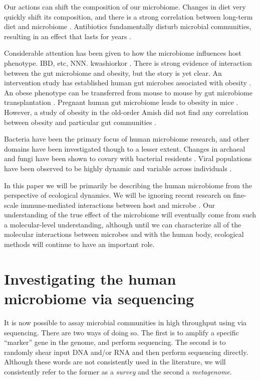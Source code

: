 \documentclass{amsart}
\begin{document}
Our actions can shift the composition of our microbiome.
Changes in diet very quickly shift its composition, and there is a strong correlation between long-term diet and microbiome \citep{li2009human,wu2011linking}.
Antibiotics fundamentally disturb microbial communities, resulting in an effect that lasts for years \citep{jernberg2007long,dethlefsen2008pervasive,jakobsson2010short,dethlefsen2011incomplete}.

Considerable attention has been given to how the microbiome influences host phenotype.
IBD, etc, NNN.
kwashiorkor \cite{smith2013gut}.
There is strong evidence of interaction between the gut microbiome and obesity, but the story is yet clear.
An intervention study has established human gut microbes associated with obesity \citep{ley2006microbial}.
An obese phenotype can be transferred from mouse to mouse by gut microbiome transplantation \citep{turnbaugh2006obesity}.
Pregnant human gut microbiome leads to obesity in mice \citep{koren2012host}.
However, a study of obesity in the old-order Amish did not find any correlation between obesity and particular gut communities \citep{zupancic2012analysis}.

Bacteria have been the primary focus of human microbiome research, and other domains have been investigated though to a lesser extent.
Changes in archaeal and fungi have been shown to covary with bacterial residents \citep{hoffmann2013archaea}.
Viral populations have been observed to be highly dynamic and variable across individuals \citep{reyes2010viruses,minot2011human,minot2013rapid}.

In this paper we will be primarily be describing the human microbiome from the perspective of ecological dynamics.
We will be ignoring recent research on fine-scale immune-mediated interactions between host and microbe \citep[reviewed in][]{hooper2012interactions}.
Our understanding of the true effect of the microbiome will eventually come from such a molecular-level understanding, although until we can characterize all of the molecular interactions between microbes and with the human body, ecological methods will continue to have an important role.


\section{Investigating the human microbiome via sequencing}
It is now possible to assay microbial communities in high throughput using via sequencing.
There are two ways of doing so.
The first is to amplify a specific ``marker'' gene in the genome, and perform sequencing.
The second is to randomly shear input DNA and/or RNA and then perform sequencing directly.
Although these words are not consistently used in the literature, we will consistently refer to the former as a \textit{survey} and the second a \textit{metagenome}.
\end{document}
